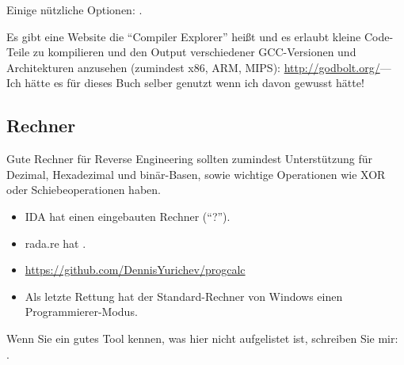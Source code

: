 Einige nützliche Optionen: .

Es gibt eine Website die ``Compiler Explorer'' heißt und es erlaubt kleine Code-Teile zu kompilieren
und den Output verschiedener GCC-Versionen und Architekturen anzusehen (zumindest x86, ARM, MIPS):
\url{http://godbolt.org/}---Ich hätte es für dieses Buch selber genutzt wenn ich davon gewusst hätte!

\subsection{Rechner}

Gute Rechner für Reverse Engineering sollten zumindest Unterstützung für Dezimal, Hexadezimal und binär-Basen,
sowie wichtige Operationen wie XOR oder Schiebeoperationen haben.

\begin{itemize}

\item IDA hat einen eingebauten Rechner (``?'').

\item rada.re hat .

\item \url{https://github.com/DennisYurichev/progcalc}

\item Als letzte Rettung hat der Standard-Rechner von Windows einen Programmierer-Modus.

\end{itemize}


Wenn Sie ein gutes Tool kennen, was hier nicht aufgelistet ist, schreiben Sie mir:\\
\TT{\EMAIL}.
